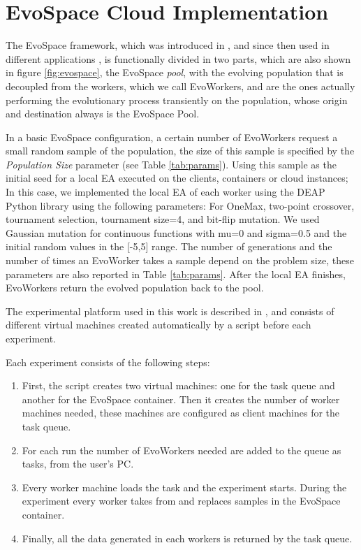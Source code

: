 \documentclass[conference]{IEEEtran}
\begin{document}
\section{EvoSpace Cloud Implementation}
\label{sec:evo}

The EvoSpace framework, which was introduced in \cite{Evospace}, and
since then used in different applications
\cite{GValdez2015,garcia2017evospace}, is functionally divided in two
parts, which are also shown in figure \ref{fig:evospace}, the EvoSpace
{\em pool}, with the evolving population that is decoupled from the
workers, which we call EvoWorkers, and are the ones actually
performing the evolutionary process transiently on the population,
whose origin and destination always is the EvoSpace Pool.

In a basic EvoSpace configuration, a certain number of EvoWorkers request a small random sample of the
population, the size of this sample is specified by the {\em Population Size} parameter (see Table \ref{tab:params}).
Using this sample as the initial seed for a local EA executed
on the clients, containers or cloud instances;  In this case, we implemented the 
local EA of each worker using the DEAP Python
library \cite{fortin2012deap} using the following parameters: For OneMax, two-point crossover,
tournament selection, tournament size=4, and bit-flip mutation.  We used
Gaussian mutation for continuous functions with mu=0 and sigma=0.5 and the
initial random values in the [-5,5] range. The number of generations and 
the number of times an EvoWorker takes a sample depend on the problem size,
these parameters are also reported in Table \ref{tab:params}. After the 
local EA finishes, EvoWorkers return the evolved population back to the pool.

The experimental platform used in this work is
described in \cite{valenzuela2015implementing}, and consists of different virtual machines
created automatically by a script before each experiment.

Each experiment consists of the following steps:

\begin{enumerate}
    \item First, the script creates two virtual machines: one for the task queue and another
    for the EvoSpace container. Then it creates the number of worker machines needed, these
    machines are configured as client machines for the task queue.
    \item For each run the number of EvoWorkers needed are added to the queue as tasks, from
    the user's PC.
    \item Every worker machine loads the task and the experiment
      starts. During the experiment every worker takes from and replaces
      samples in the EvoSpace container.
    \item Finally, all the data generated in each workers is returned by the task queue.
    \end{enumerate}
\end{document}
